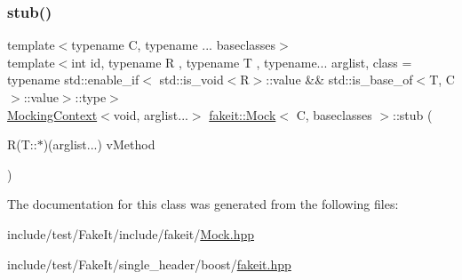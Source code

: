 \mbox{\label{classfakeit_1_1Mock_aeedcaacc82d12295f11c3fc454b75554}} 
\subsubsection{\texorpdfstring{stub()}{stub()}\hspace{0.1cm}{\footnotesize\ttfamily [72/72]}}
{\footnotesize\ttfamily template$<$typename C, typename ... baseclasses$>$ \\
template$<$int id, typename R , typename T , typename... arglist, class  = typename std\+::enable\+\_\+if$<$                std\+::is\+\_\+void$<$\+R$>$\+::value \&\& std\+::is\+\_\+base\+\_\+of$<$\+T, C$>$\+::value$>$\+::type$>$ \\
\mbox{\hyperlink{classfakeit_1_1MockingContext}{Mocking\+Context}}$<$void, arglist...$>$ \mbox{\hyperlink{classfakeit_1_1Mock}{fakeit\+::\+Mock}}$<$ C, baseclasses $>$\+::stub (\begin{DoxyParamCaption}\item[{R(T\+::$\ast$)(arglist...)}]{v\+Method }\end{DoxyParamCaption})\hspace{0.3cm}{\ttfamily [inline]}}



The documentation for this class was generated from the following files\+:\begin{DoxyCompactItemize}
\item 
include/test/\+Fake\+It/include/fakeit/\mbox{\hyperlink{Mock_8hpp}{Mock.\+hpp}}\item 
include/test/\+Fake\+It/single\+\_\+header/boost/\mbox{\hyperlink{single__header_2boost_2fakeit_8hpp}{fakeit.\+hpp}}\end{DoxyCompactItemize}
